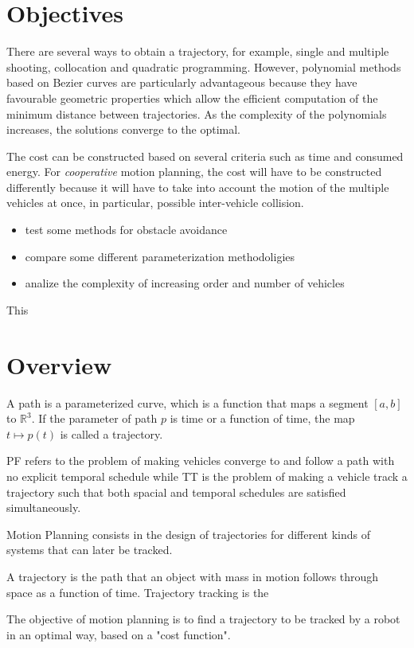 \section{Objectives}


\par There are several ways to obtain a trajectory, for example, single and multiple shooting, collocation and quadratic programming. However, polynomial methods based on Bezier curves are particularly advantageous because they have favourable geometric properties which allow the efficient computation of the minimum distance between trajectories. As the complexity of the polynomials increases, the solutions converge to the optimal.
\par The cost can be constructed based on several criteria such as time and consumed energy. For \textit{cooperative} motion planning, the cost will have to be constructed differently because it will have to take into account the motion of the multiple vehicles at once, in particular, possible inter-vehicle collision.


\begin{itemize}
    \item test some methods for obstacle avoidance
    \item compare some different parameterization methodoligies
    \item analize the complexity of increasing order and number of vehicles
\end{itemize}


\par This 

\section{Overview}

\par A path is a parameterized curve, which is a function that maps a segment $[a,b]$ to $\mathbb{R}^3$. If the parameter of path $p$ is time or a function of time, the map $t\mapsto p(t)$ is called a trajectory.
\par \ac{PF} refers to the problem of making vehicles converge to and follow a path with no explicit temporal schedule while \ac{TT} is the problem of making a vehicle track a trajectory such that both spacial and temporal schedules are satisfied simultaneously.
\par Motion Planning consists in the design of trajectories for different kinds of systems that can later be tracked.
\par A trajectory is the path that an object with mass in motion follows through space as a function of time. Trajectory tracking is the 
\par The objective of motion planning is to find a trajectory to be tracked by a robot in an optimal way, based on a "cost function".
\par 


